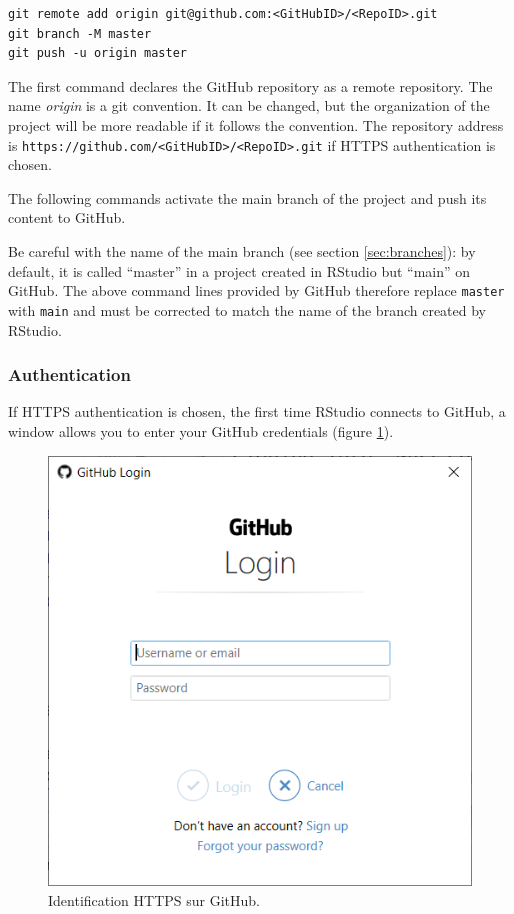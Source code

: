 \documentclass[
  12pt,
  american,
  a4paper,
  extrafontsizes,onecolumn,openright
  ]{memoir}
\begin{document}
\begin{verbatim}
git remote add origin git@github.com:<GitHubID>/<RepoID>.git
git branch -M master
git push -u origin master
\end{verbatim}

The first command declares the GitHub repository as a remote repository.
The name \emph{origin} is a git convention.
It can be changed, but the organization of the project will be more readable if it follows the convention.
The repository address is \texttt{https://github.com/\textless{}GitHubID\textgreater{}/\textless{}RepoID\textgreater{}.git} if HTTPS authentication is chosen.

The following commands activate the main branch of the project and push its content to GitHub.

Be careful with the name of the main branch (see section \ref{sec:branches}): by default, it is called \enquote{master} in a project created in RStudio but \enquote{main} on GitHub.
The above command lines provided by GitHub therefore replace \texttt{master} with \texttt{main} and must be corrected to match the name of the branch created by RStudio.

\hypertarget{authentication}{%
\subsubsection{Authentication}\label{authentication}}

If HTTPS authentication is chosen, the first time RStudio connects to GitHub, a window allows you to enter your GitHub credentials (figure \ref{fig:git-PAT}).



\scriptsize

\begin{figure}

{\centering \includegraphics[width=0.8\linewidth]{images/git-PAT} 

}

\caption{Identification HTTPS sur GitHub.}\label{fig:git-PAT}
\end{figure}
\end{document}
